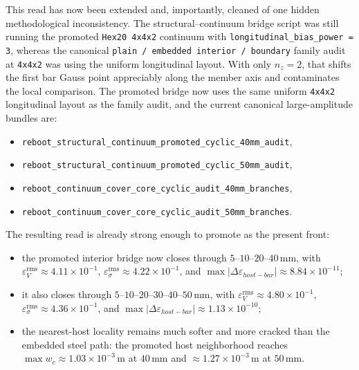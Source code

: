 This read has now been extended and, importantly, cleaned of one hidden
methodological inconsistency. The structural--continuum bridge script was still
running the promoted \texttt{Hex20 4x4x2} continuum with
\texttt{longitudinal\_bias\_power = 3}, whereas the canonical
\texttt{plain / embedded interior / boundary} family audit at \texttt{4x4x2}
was using the uniform longitudinal layout. With only \(n_z = 2\), that shifts
the first bar Gauss point appreciably along the member axis and contaminates
the local comparison. The promoted bridge now uses the same uniform
\texttt{4x4x2} longitudinal layout as the family audit, and the current
canonical large-amplitude bundles are:
\begin{itemize}
  \item \texttt{reboot\_structural\_continuum\_promoted\_cyclic\_40mm\_audit},
  \item \texttt{reboot\_structural\_continuum\_promoted\_cyclic\_50mm\_audit},
  \item \texttt{reboot\_continuum\_cover\_core\_cyclic\_audit\_40mm\_branches},
  \item \texttt{reboot\_continuum\_cover\_core\_cyclic\_audit\_50mm\_branches}.
\end{itemize}

The resulting read is already strong enough to promote as the present front:
\begin{itemize}
  \item the promoted interior bridge now closes through
    \(5\)--\(10\)--\(20\)--\(40\,\mathrm{mm}\), with
    \(\varepsilon_V^{\mathrm{rms}} \approx 4.11\times10^{-1}\),
    \(\varepsilon_{\sigma}^{\mathrm{rms}} \approx 4.22\times10^{-1}\), and
    \(\max |\Delta \varepsilon_{host-bar}| \approx 8.84\times10^{-11}\);
  \item it also closes through
    \(5\)--\(10\)--\(20\)--\(30\)--\(40\)--\(50\,\mathrm{mm}\), with
    \(\varepsilon_V^{\mathrm{rms}} \approx 4.80\times10^{-1}\),
    \(\varepsilon_{\sigma}^{\mathrm{rms}} \approx 4.36\times10^{-1}\), and
    \(\max |\Delta \varepsilon_{host-bar}| \approx 1.13\times10^{-10}\);
  \item the nearest-host locality remains much softer and more cracked than
    the embedded steel path: the promoted host neighborhood reaches
    \(\max w_c \approx 1.03\times10^{-3}\,\mathrm{m}\) at \(40\,\mathrm{mm}\)
    and \(\approx 1.27\times10^{-3}\,\mathrm{m}\) at \(50\,\mathrm{mm}\).
\end{itemize}

